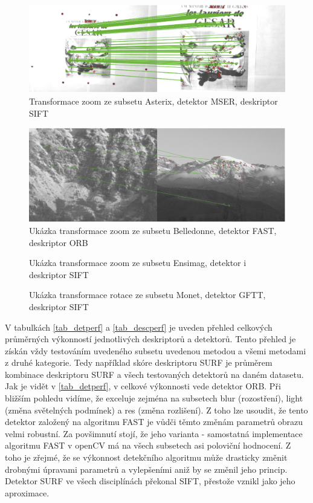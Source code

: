\begin{figure}[!ht] 
	\centering
		\includegraphics[width=5in]{img/ex_ASTERIX_MSER_SIFT.png}
	\caption{Transformace zoom ze subsetu Asterix, detektor MSER,
		deskriptor SIFT} \label{ex_asterix}
\end{figure}

\begin{figure}[!ht] 
	\centering
		\includegraphics[width=5in]{img/ex_BELLEDONNE_FAST_ORB.png}
	\caption{Ukázka transformace zoom ze subsetu Belledonne, detektor FAST,
		deskriptor ORB}	\label{ex_belledonne}
\end{figure}

\begin{figure}[!ht] 
	\caption{Ukázka transformace zoom ze subsetu Ensimag, detektor i 
		deskriptor SIFT} \label{ex_ensimag}
\end{figure}

\begin{figure}[!ht] 
	\caption{Ukázka transformace rotace ze subsetu Monet, detektor GFTT, 
		deskriptor SIFT} \label{ex_MONET}
\end{figure}

V tabulkách \ref{tab_detperf} a \ref{tab_descperf} je uveden přehled celkových průměrných výkonností jednotlivých deskriptorů a detektorů. Tento přehled je získán vždy testováním uvedeného subsetu uvedenou metodou a všemi metodami z druhé kategorie. Tedy například skóre deskriptoru SURF je průměrem kombinace deskriptoru SURF a všech testovaných detektorů na daném datasetu. Jak je vidět v \ref{tab_detperf}, v celkové výkonnosti vede detektor ORB. Při bližším pohledu vidíme, že exceluje zejména na subsetech blur (rozostření), light (změna světelných podmínek) a res (změna rozlišení). Z toho lze usoudit, že tento detektor založený na algoritmu FAST je vůdči těmto změnám parametrů obrazu velmi robustní. Za povšimnutí stojí, že jeho varianta - samostatná implementace algoritmu FAST v openCV má na všech subsetech asi poloviční hodnocení. Z toho je zřejmé, že se výkonnost detekčního algoritmu může drasticky změnit drobnými úpravami parametrů a vylepšeními aniž by se změnil jeho princip. Detektor SURF ve všech disciplínách překonal SIFT, přestože vznikl jako jeho aproximace.


